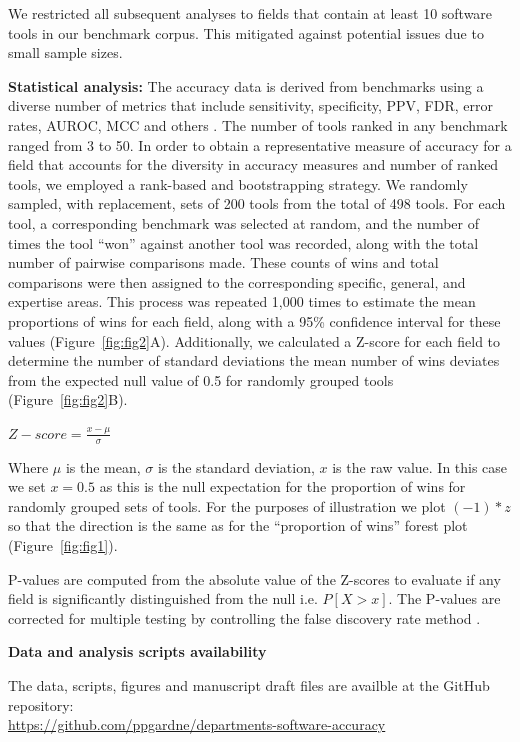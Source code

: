 \documentclass[fleqn,10pt,doc,onecolumn]{SelfArx}%
\begin{document}
We restricted all subsequent analyses to fields that contain at least 10
software tools in our benchmark corpus. This mitigated against
potential issues due to small sample sizes. 

\textbf{Statistical analysis:} The accuracy data is derived from
benchmarks using a diverse number of metrics that include sensitivity,
specificity, PPV, FDR, error rates, AUROC, MCC and others
\cite{weber2019essential}. The number of tools ranked in any benchmark
ranged from 3 to 50. In order to obtain a representative measure of
accuracy for a field that accounts for the diversity in accuracy measures and
number of ranked tools, we employed a rank-based and
bootstrapping strategy.
We randomly sampled, with replacement, sets of 200 tools from the total of 498 tools. For each tool, a corresponding benchmark was selected at random, and the number of times the tool ``won'' against another tool was recorded, along with the total number of pairwise comparisons made. These counts of wins and total comparisons were then assigned to the corresponding specific, general, and expertise areas. This process was repeated 1,000 times to estimate the mean proportions of wins for each field, along with a 95\% confidence interval for these values (Figure~\ref{fig:fig2}A).
Additionally, we calculated a Z-score for each field to determine the number of standard deviations the mean number of wins deviates from the expected null value of 0.5 for randomly grouped tools
(Figure~\ref{fig:fig2}B).

$Z-score=\frac{x-\mu}{\sigma}$

Where $\mu$ is the mean, $\sigma$ is the standard deviation, $x$ is the raw
value. In this case we set $x=0.5$ as this is the null expectation for
the proportion of wins for randomly grouped sets of tools. For the
purposes of illustration we plot $(-1)*z$ so that the direction is the
same as for the ``proportion of wins'' forest plot
(Figure~\ref{fig:fig1}). 

P-values are computed from the absolute value of the Z-scores to
evaluate if any field is significantly distinguished from the null
i.e. $P[X > x]$. The P-values are corrected for multiple testing by
controlling the false discovery rate method
\cite{benjamini1995controlling}.


\noindent\textbf{Data and analysis scripts availability}

The data, scripts, figures and manuscript draft files are availble at the GitHub repository:\\
\href{https://github.com/ppgardne/departments-software-accuracy}{https://github.com/ppgardne/departments-software-accuracy}
\end{document}
